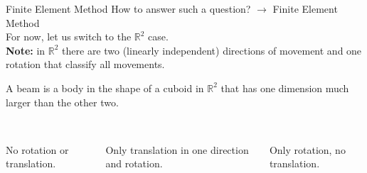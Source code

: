 \documentclass{beamer}
\numberwithin{equation}{aufgabe}
\newcommand\R{\mathbb R}
\begin{document}
\begin{frame}{Finite Element Method}
    How to answer such a question? \pause $\xrightarrow{}$ Finite Element Method\\
    For now, let us switch to the $\R^2$ case.\\ \pause
    \textbf{Note:} in $\R^2$ there are two (linearly independent) directions of movement and one rotation that classify all movements.
    \pause
    \begin{definition}[Beam]
        A beam is a body in the shape of a cuboid in $\R^2$ that has one dimension much larger than the other two.
    \end{definition}
    \pause
    \begin{definition}[Supports]
        \begin{columns}
        \begin{column}{0.21\textwidth}
            \\
            No rotation or translation.
        \end{column}
        \pause
        \begin{column}{0.3\textwidth}
            \\
            Only translation in one direction and rotation.
        \end{column}
        \pause
        \begin{column}{0.3\textwidth}
            \\
            Only rotation, no translation.
        \end{column}
        \end{columns}
    \end{definition}

\end{frame}
\end{document}
